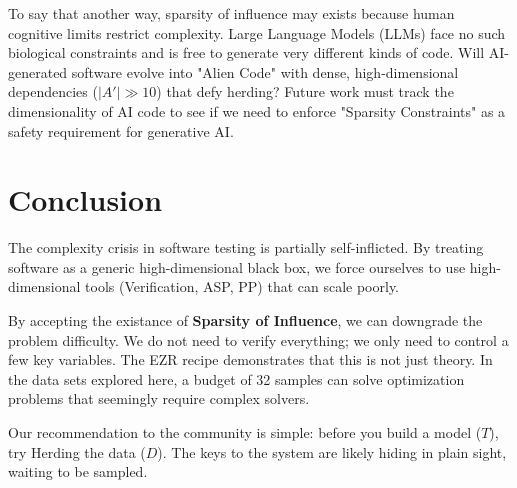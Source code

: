 \documentclass[pdflatex,sn-basic]{sn-jnl}
\begin{document}
To say that another way,  sparsity of influence may exists   because  human cognitive
    limits restrict complexity. Large Language Models (LLMs) face no such
    biological constraints and is free to generate very different kinds of code. Will AI-generated software evolve into "Alien Code"
    with dense, high-dimensional dependencies ($|A'| \gg 10$) that defy
    herding? Future work must track the dimensionality of AI code to see if we
    need to enforce "Sparsity Constraints" as a safety requirement for
    generative AI.

    
\section{Conclusion}
The complexity crisis in software testing is partially self-inflicted. By 
treating software as a generic high-dimensional black box, we force ourselves 
to use high-dimensional tools (Verification, ASP, PP) that can scale poorly.

By accepting the existance of \textbf{Sparsity of Influence}, we 
can downgrade the problem difficulty. We do not need to verify everything; 
we only need to control a few key variables.  
The EZR recipe demonstrates that this is not just theory. In the data sets explored here, a budget of 
32 samples can solve optimization problems that seemingly require 
complex solvers.

Our recommendation to the community is simple: before you build a model ($T$), 
try Herding the data ($D$). The keys to the system are likely hiding in 
plain sight, waiting to be sampled.
\end{document}
